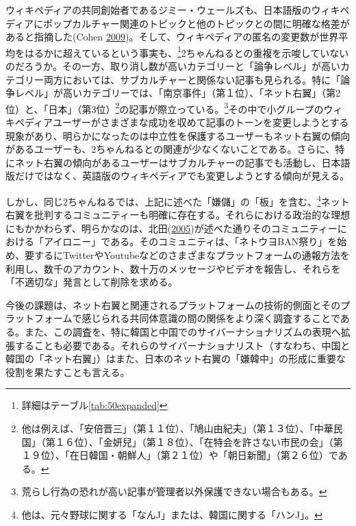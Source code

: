 \documentclass[10pt,british,A4paper,oneside]{memoir}
\begin{document}
ウィキペディアの共同創始者であるジミー・ウェールズも、日本語版のウィキペディアにポップカルチャー関連のトピックと他のトピックとの間に明確な格差があると指摘した(Cohen
\protect\hyperlink{ref-cohen_wikipedia_2009}{2009})。そして、ウィキペディアの匿名の変更数が世界平均をはるかに超えているという事実も、\footnote{詳細はテーブル\ref{tab:50expanded}}2ちゃんねるとの重複を示唆していないのだろうか。その一方、取り消し数が高いカテゴリーと「論争レベル」が高いカテゴリー両方においては、サブカルチャーと関係ない記事も見られる。特に「論争レベル」が高いカテゴリーでは、「南京事件」（第１位）、「ネット右翼」（第2位）と、「日本」（第3位）\footnote{他は例えば、「安倍晋三」（第１１位）、「鳩山由紀夫」（第１３位）、「中華民国」（第１６位）、「金妍兒」（第１８位）、「在特会を許さない市民の会」（第１９位）、「在日韓国・朝鮮人」（第２１位）や「朝日新聞」（第２６位）である。}の記事が際立っている。\footnote{荒らし行為の恐れが高い記事が管理者以外保護できない場合もある。}その中で小グループのウィキペディアユーザーがさまざまな成功を収めて記事のトーンを変更しようとする現象があり、明らかになったのは中立性を保護するユーザーもネット右翼の傾向があるユーザーも、2ちゃんねるとの関連が少なくないことである。さらに、特にネット右翼の傾向があるユーザーはサブカルチャーの記事でも活動し、日本語版だけではなく、英語版のウィキペディアでも変更しようとする傾向が見える。

しかし、同じ2ちゃんねるでは、上記に述べた「嫌儲」の「板」を含む、\footnote{他は、元々野球に関する「なんJ」または、韓国に関する「ハンJ」。}ネット右翼を批判するコミュニティーも明確に存在する。それらにおける政治的な理想にもかかわらず、明らかなのは、北田(\protect\hyperlink{ref-kitada_eng:_2005}{2005})が述べた通りそのコミュニティーにおける「アイロニー」である。そのコミュニティは、「ネトウヨBAN祭り」を始め、要するにTwitterやYoutubeなどのさまざまなプラットフォームの通報方法‎を利用し、数千のアカウント、数十万のメッセージやビデオを報告し、それらを「不適切な」発言として削除を求める。

今後の課題は、ネット右翼と関連されるプラットフォームの技術的側面とそのプラットフォームで感じられる共同体意識の間の関係をより深く調査することである。また、この調査を、特に韓国と中国でのサイバーナショナリズムの表現へ拡張することも必要である。それらのサイバーナショナリスト（すなわち、中国と韓国の「ネット右翼」）はまた、日本のネット右翼の「嫌韓中」の形成に重要な役割を果たすことも言える。

\setcounter{footnote}{0}

\newpage

\tableofcontents
\end{document}
